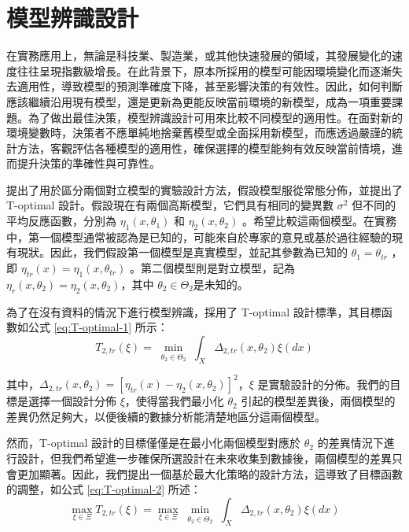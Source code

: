\section{模型辨識設計}

\hspace*{8mm} 在實務應用上，無論是科技業、製造業，或其他快速發展的領域，其發展變化的速度往往呈現指數級增長。在此背景下，原本所採用的模型可能因環境變化而逐漸失去適用性，導致模型的預測準確度下降，甚至影響決策的有效性。因此，如何判斷應該繼續沿用現有模型，還是更新為更能反映當前環境的新模型，成為一項重要課題。為了做出最佳決策，模型辨識設計可用來比較不同模型的適用性。在面對新的環境變數時，決策者不應單純地捨棄舊模型或全面採用新模型，而應透過嚴謹的統計方法，客觀評估各種模型的適用性，確保選擇的模型能夠有效反映當前情境，進而提升決策的準確性與可靠性。

\hspace*{8mm} \cite{atkinson1975design,atkinson1975optimal} 提出了用於區分兩個對立模型的實驗設計方法，假設模型服從常態分佈，並提出了T-optimal 設計。假設現在有兩個高斯模型，它們具有相同的變異數 $\sigma^2$ 但不同的平均反應函數，分別為 $\eta_1(x, \theta_{1})$ 和 $\eta_2(x, \theta_{2})$ 。希望比較這兩個模型。在實務中，第一個模型通常被認為是已知的，可能來自於專家的意見或基於過往經驗的現有現狀。因此，我們假設第一個模型是真實模型，並記其參數為已知的 $\theta_1=\theta_{tr}$ ，即 $\eta_{tr}(x)=\eta_1(x, \theta_{tr})$ 。第二個模型則是對立模型，記為 $\eta_r(x, \theta_{2})=\eta_2(x, \theta_{2})$，其中 $\theta_2\in \Theta_2$是未知的。

\hspace*{8mm} 為了在沒有資料的情況下進行模型辨識，採用了 T-optimal 設計標準，其目標函數如公式 \eqref{eq:T-optimal-1} 所示：
\begin{equation}\label{eq:T-optimal-1}
T_{2,tr}(\xi)=\min_{\substack{\theta_2\in \Theta_2}}\int_{X}\Delta_{2,tr}(x,\theta_2) \xi(dx)
\end{equation}

其中，$\Delta_{2,tr}(x,\theta_2)=\left[\eta_{tr}(x)-\eta_2(x,\theta_2)\right]^2$，$\xi$ 是實驗設計的分佈。我們的目標是選擇一個設計分佈 $\xi$，使得當我們最小化 $\theta_2$ 引起的模型差異後，兩個模型的差異仍然足夠大，以便後續的數據分析能清楚地區分這兩個模型。

\hspace*{8mm} 然而，T-optimal 設計的目標僅僅是在最小化兩個模型對應於 $\theta_2$ 的差異情況下進行設計，但我們希望進一步確保所選設計在未來收集到數據後，兩個模型的差異只會更加顯著。因此，我們提出一個基於最大化策略的設計方法，這導致了目標函數的調整，如公式 \eqref{eq:T-optimal-2} 所述：
\begin{equation}\label{eq:T-optimal-2}
\max_{\xi\in \Xi} T_{2,tr}(\xi)=\max_{\xi\in \Xi} \min_{\substack{\theta_2\in \Theta_2}}\int_{X}\Delta_{2,tr}(x,\theta_2) \xi(dx)
\end{equation}

